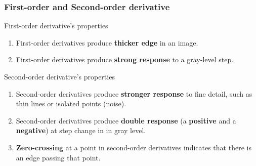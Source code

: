 \documentclass[english,11pt,table,handout]{beamer}
\begin{document}
\frame
{
	\frametitle{First-order and Second-order derivative}
	\begin{alertblock}{First-order derivative's properties}
		\begin{enumerate}
			\item First-order derivatives produce \alert{\textbf{thicker edge}} in an image.
			\item First-order derivatives produce \alert{\textbf{strong response}} to a gray-level step.
			
		\end{enumerate}
		
	\end{alertblock}
	
	\begin{alertblock}{Second-order derivative's properties}
		\begin{enumerate}
			\item Second-order derivatives produce \alert{\textbf{stronger response}} to fine detail, such as thin lines or isolated points (noise).
			\item Second-order derivatives produce \alert{\textbf{double response}} (a \alert{\textbf{positive}} and a \alert{\textbf{negative}}) at step change in in gray level.
			\item \alert{\textbf{Zero-crossing}} at a point in second-order derivatives indicates that there is an edge passing that point.
			
		\end{enumerate}
		
	\end{alertblock}
}
\end{document}
